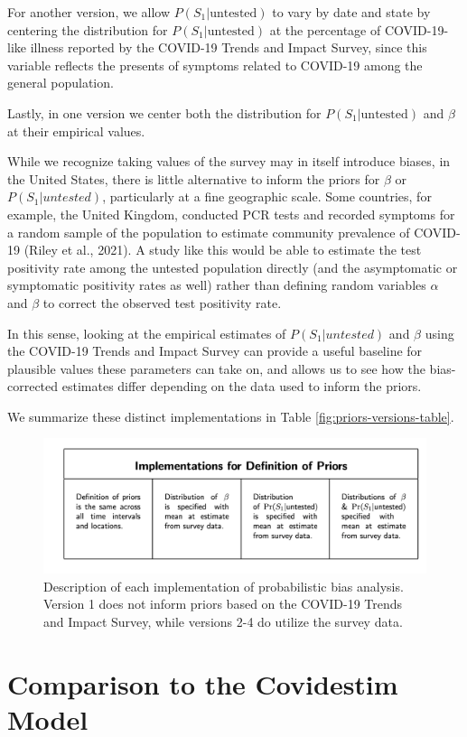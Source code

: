 \documentclass[12pt,twoside]{smiththesis}
\begin{document}
For another version, we allow \(P(S_1|\text{untested})\) to vary by date and state by centering the distribution for \(P(S_1|\text{untested})\) at the percentage of COVID-19-like illness reported by the COVID-19 Trends and Impact Survey, since this variable reflects the presents of symptoms related to COVID-19 among the general population.

Lastly, in one version we center both the distribution for \(P(S_1|\text{untested})\) and \(\beta\) at their empirical values.

While we recognize taking values of the survey may in itself introduce biases, in the United States, there is little alternative to inform the priors for \(\beta\) or \(P(S_1|untested)\), particularly at a fine geographic scale. Some countries, for example, the United Kingdom, conducted PCR tests and recorded symptoms for a random sample of the population to estimate community prevalence of COVID-19 (Riley et al., 2021). A study like this would be able to estimate the test positivity rate among the untested population directly (and the asymptomatic or symptomatic positivity rates as well) rather than defining random variables \(\alpha\) and \(\beta\) to correct the observed test positivity rate.

In this sense, looking at the empirical estimates of \(P(S_1|untested)\) and \(\beta\) using the COVID-19 Trends and Impact Survey can provide a useful baseline for plausible values these parameters can take on, and allows us to see how the bias-corrected estimates differ depending on the data used to inform the priors.

We summarize these distinct implementations in Table \ref{fig:priors-versions-table}.
\begin{figure}
\includegraphics[width=1\linewidth]{figure/priors_implementations} \caption{\label{fig:priors-versions-table}Description of each implementation of probabilistic bias analysis. Version 1 does not inform priors based on the COVID-19 Trends and Impact Survey, while versions 2-4 do utilize the survey data.}\label{fig:unnamed-chunk-71}
\end{figure}
\hypertarget{comparison-to-the-covidestim-model}{%
\chapter{Comparison to the Covidestim Model}\label{comparison-to-the-covidestim-model}}
\end{document}
